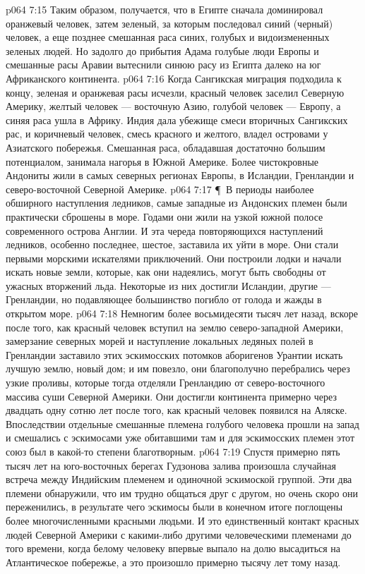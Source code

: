 \vs p064 7:15 Таким образом, получается, что в Египте сначала доминировал оранжевый человек, затем зеленый, за которым последовал синий (черный) человек, а еще позднее смешанная раса синих, голубых и видоизмененных зеленых людей. Но задолго до прибытия Адама голубые люди Европы и смешанные расы Аравии вытеснили синюю расу из Египта далеко на юг Африканского континента.
\vs p064 7:16 Когда Сангикская миграция подходила к концу, зеленая и оранжевая расы исчезли, красный человек заселил Северную Америку, желтый человек --- восточную Азию, голубой человек --- Европу, а синяя раса ушла в Африку. Индия дала убежище смеси вторичных Сангикских рас, и коричневый человек, смесь красного и желтого, владел островами у Азиатского побережья. Смешанная раса, обладавшая достаточно большим потенциалом, занимала нагорья в Южной Америке. Более чистокровные Андониты жили в самых северных регионах Европы, в Исландии, Гренландии и северо\hyp{}восточной Северной Америке.
\vs p064 7:17 \P\ В периоды наиболее обширного наступления ледников, самые западные из Андонских племен были практически сброшены в море. Годами они жили на узкой южной полосе современного острова Англии. И эта череда повторяющихся наступлений ледников, особенно последнее, шестое, заставила их уйти в море. Они стали первыми морскими искателями приключений. Они построили лодки и начали искать новые земли, которые, как они надеялись, могут быть свободны от ужасных вторжений льда. Некоторые из них достигли Исландии, другие --- Гренландии, но подавляющее большинство погибло от голода и жажды в открытом море.
\vs p064 7:18 Немногим более восьмидесяти тысяч лет назад, вскоре после того, как красный человек вступил на землю северо\hyp{}западной Америки, замерзание северных морей и наступление локальных ледяных полей в Гренландии заставило этих эскимосских потомков аборигенов Урантии искать лучшую землю, новый дом; и им повезло, они благополучно перебрались через узкие проливы, которые тогда отделяли Гренландию от северо\hyp{}восточного массива суши Северной Америки. Они достигли континента примерно через двадцать одну сотню лет после того, как красный человек появился на Аляске. Впоследствии отдельные смешанные племена голубого человека прошли на запад и смешались с эскимосами уже обитавшими там и для эскимосских племен этот союз был в какой\hyp{}то степени благотворным.
\vs p064 7:19 Спустя примерно пять тысяч лет на юго\hyp{}восточных берегах Гудзонова залива произошла случайная встреча между Индийским племенем и одиночной эскимоской группой. Эти два племени обнаружили, что им трудно общаться друг с другом, но очень скоро они переженились, в результате чего эскимосы были в конечном итоге поглощены более многочисленными красными людьми. И это единственный контакт красных людей Северной Америки с какими\hyp{}либо другими человеческими племенами до того времени, когда белому человеку впервые выпало на долю высадиться на Атлантическое побережье, а это произошло примерно тысячу лет тому назад.
